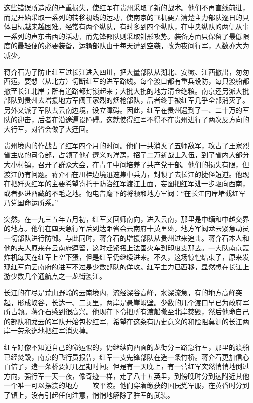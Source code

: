 \documentclass[10pt]{book}
\begin{document}
这些错误所造成的严重损失，使红军在贵州采取了新的战术。他们不再直线前进，而是开始采取一系列的转移视线的运动，使南京的飞机要弄清楚主力部队逐日的具体目标越来越困难。经常有两个纵队，有时多到四个纵队，在中央纵队的两侧从事一系列的声东击西的活动，而先锋部队则采取钳形攻势。装备方面只保留了最低限度的最轻便的必要装备，运输部队由于每天遭到空袭，改为夜间行军，人数亦大为减少。

蒋介石为了防止红军过长江进入四川，把大量部队从湖北、安徽、江西撤出，匆匆西运，要想（从北方）切断红军的进军路线。每个渡口都有重兵设防，每只渡船都撤至长江北岸；所有道路都封锁起来；大批大批的地方清仓绝粮。南京还另派大批部队到贵州去增援地方军阀王家烈的烟枪部队，后者终于被红军几乎全部消灭了。另外又派了军队去云南边境，设立障碍。因此，红军在贵州遇到了一、二十万的军队的迎击，后者在沿途遍设障碍。这就使得红军不得不在贵州进行了两次反方向的大行军，对省会做了大迂回。

贵州境内的作战占了红军四个月的时间。他们一共消灭了五师敌军，攻占了王家烈省主席的司令部，占领了他在遵义的洋房，招了二万新战士入伍，到了省内大部分大小村镇，召开了群众大会，在青年中间培养了共产党干部。他们的损失有限，但渡江仍有问题。蒋介石在川桂边境迅速集中兵力，封锁了去长江的捷径短道。他现在把歼灭红军的主要希望寄托于防治红军渡江上面，妄图把红军进一步驱向西南，或者驱进西藏的不毛之地。他电告麾下的将领和地方军阀：“在长江南岸堵截红军乃党国命运所系。”

突然，在一九三五年五月初，红军又回师南向，进入云南，那里是中缅和中越交界的地方。他们在四天急行军后到达距省会云南府十英里处，地方军阀龙云紧急动员一切部队进行防御。与此同时，蒋介石的增援部队从贵州过来追击。蒋介石本人和他的夫人原来在云南府逗留，这时赶紧搭上法国火车到印度支那去。一大队南京轰炸机每天在红军上空下蛋，但是红军仍继续进来。不久，这场惊惶结束了，原来发现红军向云南府的进军不过是少数部队的佯攻。红军主力已西移，显然想在长江上游少数几个通航点之一龙街渡江。

长江的在尽是荒山野岭的云南境内，流经深谷高峰，水深流急，有的地方高峰突起，形成峡谷，长达一、二英里，两岸是悬崖峭壁。少数的几个渡口早已为政府军所占领。蒋介石感到很高兴。他现在下令把所有渡船撤至北岸焚毁，然后他命自己的部队和龙云的军队开始包抄红军，希望在这条有历史意义的和险阻莫测的长江两岸一劳永逸地把红军消灭掉。

红军好像不知道自己的命运似的，仍继续向西面的龙街分三路急行军，那里的渡船已经焚毁，南京的飞行员报告，红军一支先锋部队在造一条竹桥。蒋介石更加信心百倍了，造一条桥要好几星期时间。但是有一天晚上，有一营红军突然悄悄地倒过方向，强行军一天一夜，像奇迹一样，走了八十五英里，到傍晚时分到达附近其他一个唯一可以摆渡的地方——皎平渡。他们穿着缴获的国民党军服，在黄昏时分到了镇上，没有引起任何注意，悄悄地解除了驻军的武装。
\end{document}
